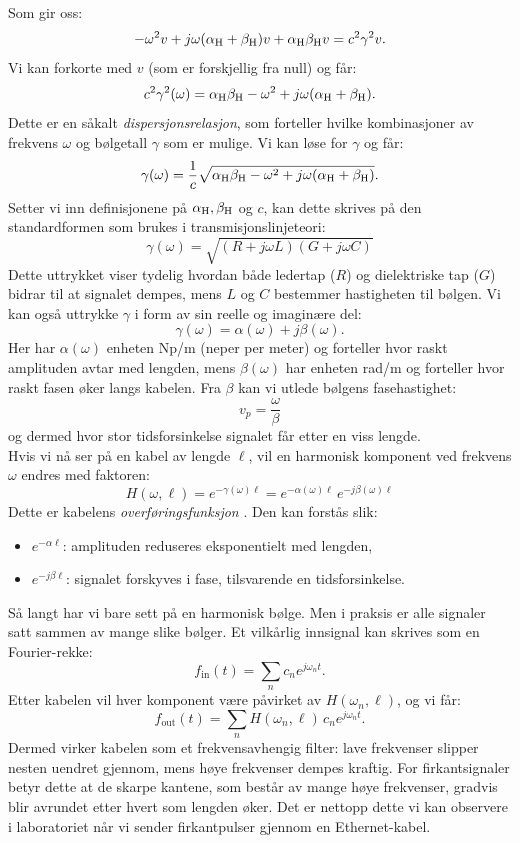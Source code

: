 Som gir oss:
\[    
-\omega^2 v + j\omega(\alpha_{\mathrm{H}}+\beta_{\mathrm{H}})v + \alpha_{\mathrm{H}} \beta_{\mathrm{H}} v = c^2 \gamma^2 v.
\]
Vi kan forkorte med $v$ (som er forskjellig fra null) og får:
\[
c^2 \gamma^2(\omega) = \alpha_{\mathrm{H}} \beta_{\mathrm{H}} - \omega^2 + j\omega(\alpha_{\mathrm{H}}+\beta_{\mathrm{H}}).
\]
\clearpage
\noindent Dette er en såkalt \emph{dispersjonsrelasjon}, som forteller hvilke kombinasjoner av 
frekvens $\omega$ og bølgetall $\gamma$ som er mulige. Vi kan løse for $\gamma$ og får:
\[
\gamma(\omega) = \frac{1}{c}\sqrt{\alpha_{\mathrm{H}}\beta_{\mathrm{H}} - \omega^2 + j\omega(\alpha_{\mathrm{H}}+\beta_{\mathrm{H}})}.
\]
Setter vi inn definisjonene på $\alpha_{\mathrm{H}},\beta_{\mathrm{H}}$ og $c$, kan dette skrives på den standardformen
som brukes i transmisjonslinjeteori:
\begin{equation}
\;\gamma(\omega) = \sqrt{(R+j\omega L)(G+j\omega C)}\;
\label{eq:prop-konstant}
\end{equation}
Dette uttrykket viser tydelig hvordan både ledertap ($R$) og dielektriske tap ($G$) bidrar 
til at signalet dempes, mens $L$ og $C$ bestemmer hastigheten til bølgen. Vi kan også uttrykke $\gamma$
i form av sin reelle og imaginære del:
\[
\gamma(\omega) = \alpha(\omega) + j\beta(\omega).
\]
Her har $\alpha(\omega)$ enheten Np/m (neper per meter) og forteller hvor raskt amplituden 
avtar med lengden, mens $\beta(\omega)$ har enheten rad/m og forteller hvor raskt fasen 
øker langs kabelen. Fra $\beta$ kan vi utlede bølgens fasehastighet:
\[v_p = \frac{\omega}{\beta}\]
og dermed hvor stor tidsforsinkelse signalet får etter en viss lengde.\\[1em]
Hvis vi nå ser på en kabel av lengde $\ell$, vil en harmonisk komponent ved frekvens $\omega$ 
endres med faktoren:
\begin{equation}
H(\omega,\ell) = e^{-\gamma(\omega)\ell} = e^{-\alpha(\omega)\ell}\,e^{-j\beta(\omega)\ell}
\end{equation}
Dette er kabelens \emph{overføringsfunksjon} \cite{wikipedia_telegrapher}. 
Den kan forstås slik:
\begin{itemize}
    \item \textbf{$e^{-\alpha \ell}$}: amplituden reduseres eksponentielt med lengden, 
    \item \textbf{$e^{-j\beta \ell}$}: signalet forskyves i fase, tilsvarende en tidsforsinkelse.\\[1em]
\end{itemize}
Så langt har vi bare sett på en harmonisk bølge. Men i praksis er alle signaler satt sammen av mange slike bølger. 
Et vilkårlig innsignal kan skrives som en Fourier-rekke:
\[
f_{\text{in}}(t) = \sum_n c_n e^{j\omega_n t}.
\]
Etter kabelen vil hver komponent være påvirket av $H(\omega_n,\ell)$, og vi får:
\[
f_{\text{out}}(t) = \sum_n H(\omega_n,\ell)\,c_n e^{j\omega_n t}.
\]
Dermed virker kabelen som et frekvensavhengig filter: lave frekvenser slipper nesten uendret gjennom, 
mens høye frekvenser dempes kraftig. For firkantsignaler betyr dette at de skarpe kantene, 
som består av mange høye frekvenser, gradvis blir avrundet etter hvert som lengden øker. 
Det er nettopp dette vi kan observere i laboratoriet når vi sender firkantpulser gjennom en Ethernet-kabel.



